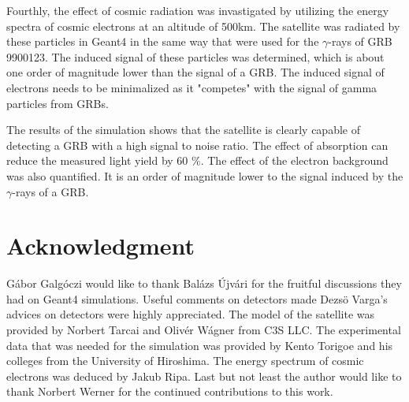 \documentclass[12pt, a4paper,titlepage]{article}
\numberwithin{equation}{section}
\numberwithin{figure}{section}
\begin{document}
Fourthly, the effect of cosmic radiation was invastigated by utilizing the energy spectra of cosmic electrons at an altitude of 500km. The satellite was radiated by these particles in Geant4 in the same way that were used for the $\gamma$-rays of GRB 9900123. The induced signal of these particles was determined, which is about one order of magnitude lower than the signal of a GRB. The induced signal of electrons needs to be minimalized as it "competes" with the signal of gamma particles from GRBs.

The results of the simulation shows that the satellite is clearly capable of detecting a GRB with a high signal to noise ratio. The effect of absorption can reduce the measured light yield by 60 \%. The effect of the electron background was also quantified. It is an order of magnitude lower to the signal induced by the $\gamma$-rays of a GRB. 

\pagebreak

\section{Acknowledgment}

G\'abor Galg\'oczi would like to thank Bal\'azs \'Ujv\'ari for the fruitful discussions they had on Geant4 simulations. Useful comments on detectors made Dezs\"o Varga's advices on detectors were highly appreciated. The model of the satellite was provided by Norbert Tarcai and Olivér Wágner from C3S LLC. The experimental data that was needed for the simulation was provided by Kento Torigoe and his colleges from the University of Hiroshima. The energy spectrum of cosmic electrons was deduced by Jakub Ripa. Last but not least the author would like to thank Norbert Werner for the continued contributions to this work.  

\pagebreak
\end{document}
